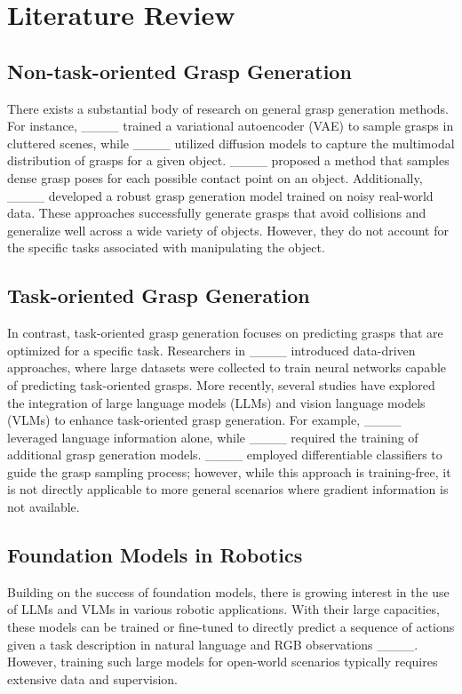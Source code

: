 \section{Literature Review}
\label{review} \subsection{Non-task-oriented Grasp Generation} 
There exists a substantial body of research on general grasp generation methods. For instance, ____ trained a variational autoencoder (VAE) to sample grasps in cluttered scenes, while ____ utilized diffusion models to capture the multimodal distribution of grasps for a given object. ____ proposed a method that samples dense grasp poses for each possible contact point on an object. Additionally, ____ developed a robust grasp generation model trained on noisy real-world data. These approaches successfully generate grasps that avoid collisions and generalize well across a wide variety of objects. However, they do not account for the specific tasks associated with manipulating the object.

\subsection{Task-oriented Grasp Generation} 
In contrast, task-oriented grasp generation focuses on predicting grasps that are optimized for a specific task. Researchers in ____ introduced data-driven approaches, where large datasets were collected to train neural networks capable of predicting task-oriented grasps. More recently, several studies have explored the integration of large language models (LLMs) and vision language models (VLMs) to enhance task-oriented grasp generation. For example, ____ leveraged language information alone, while ____ required the training of additional grasp generation models. ____ employed differentiable classifiers to guide the grasp sampling process; however, while this approach is training-free, it is not directly applicable to more general scenarios where gradient information is not available.

\subsection{Foundation Models in Robotics} 
Building on the success of foundation models, there is growing interest in the use of LLMs and VLMs in various robotic applications. With their large capacities, these models can be trained or fine-tuned to directly predict a sequence of actions given a task description in natural language and RGB observations ____. However, training such large models for open-world scenarios typically requires extensive data and supervision.

